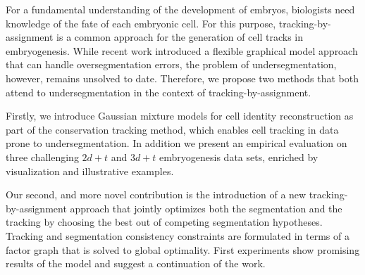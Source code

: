 


For a fundamental understanding of the development of embryos, biologists need knowledge of the fate
of each embryonic cell. For this purpose, tracking-by-assignment is a common approach for the
generation of cell tracks in embryogenesis. While recent work introduced a flexible graphical model
approach that can handle oversegmentation errors, the problem of undersegmentation, however, remains
unsolved to date. Therefore, we propose two methods that both attend to undersegmentation in the
context of tracking-by-assignment.

Firstly, we introduce Gaussian mixture models for cell identity reconstruction as part of the
conservation tracking method, which enables cell tracking in data prone to undersegmentation. In
addition we present an empirical evaluation on three challenging $2d+t$ and $3d+t$ embryogenesis
data sets, enriched by visualization and illustrative examples.

Our second, and more novel contribution is the introduction of a new tracking-by-assignment approach
that jointly optimizes both the segmentation and the tracking by choosing the best out of competing
segmentation hypotheses. Tracking and segmentation consistency constraints are formulated in terms
of a factor graph that is solved to global optimality. First experiments show promising results
of the model and suggest a continuation of the work.

